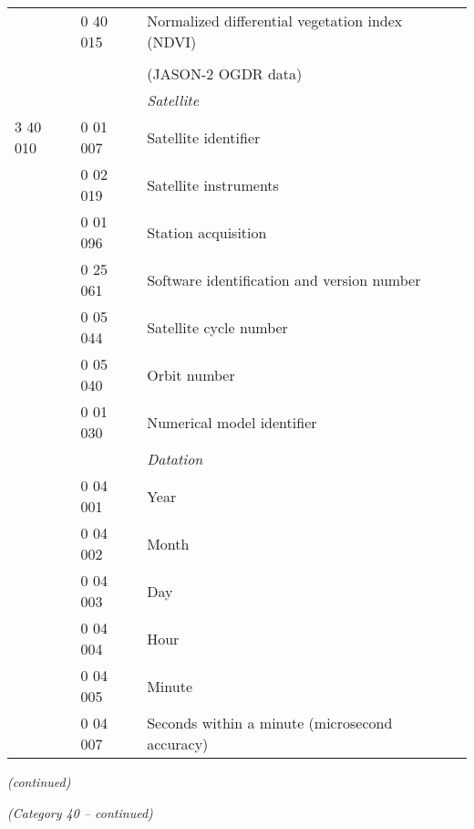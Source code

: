 \begin{longtable}[]{@{}llll@{}}
& 0 40 015 & Normalized differential vegetation index (NDVI) &\tabularnewline
& & &\tabularnewline
& & (JASON-2 OGDR data) &\tabularnewline
& & \emph{Satellite} &\tabularnewline
3 40 010 & 0 01 007 & Satellite identifier &\tabularnewline
& 0 02 019 & Satellite instruments &\tabularnewline
& 0 01 096 & Station acquisition &\tabularnewline
& 0 25 061 & Software identification and version number &\tabularnewline
& 0 05 044 & Satellite cycle number &\tabularnewline
& 0 05 040 & Orbit number &\tabularnewline
& 0 01 030 & Numerical model identifier &\tabularnewline
& & \emph{Datation} &\tabularnewline
& 0 04 001 & Year &\tabularnewline
& 0 04 002 & Month &\tabularnewline
& 0 04 003 & Day &\tabularnewline
& 0 04 004 & Hour &\tabularnewline
& 0 04 005 & Minute &\tabularnewline
& 0 04 007 & Seconds within a minute (microsecond accuracy) &\tabularnewline
\bottomrule
\end{longtable}

\emph{(continued)}

\emph{(Category 40 -- continued)}

